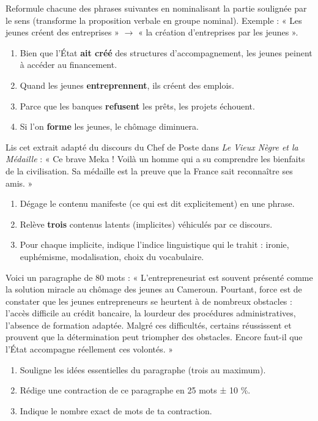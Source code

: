\documentclass[11pt]{article}
\begin{document}
\begin{exercice}[Nominalisation]
Reformule chacune des phrases suivantes en nominalisant la partie soulignée par le sens (transforme la proposition verbale en groupe nominal). Exemple : « Les jeunes créent des entreprises » $\rightarrow$ « la création d'entreprises par les jeunes ».
\begin{enumerate}
\item Bien que l'État \textbf{ait créé} des structures d'accompagnement, les jeunes peinent à accéder au financement.
\item Quand les jeunes \textbf{entreprennent}, ils créent des emplois.
\item Parce que les banques \textbf{refusent} les prêts, les projets échouent.
\item Si l'on \textbf{forme} les jeunes, le chômage diminuera.
\end{enumerate}
\end{exercice}

\begin{exercice}
Lis cet extrait adapté du discours du Chef de Poste dans \emph{Le Vieux Nègre et la Médaille} : « Ce brave Meka ! Voilà un homme qui a su comprendre les bienfaits de la civilisation. Sa médaille est la preuve que la France sait reconnaître ses amis. »
\begin{enumerate}
\item Dégage le contenu manifeste (ce qui est dit explicitement) en une phrase.
\item Relève \textbf{trois} contenus latents (implicites) véhiculés par ce discours.
\item Pour chaque implicite, indique l'indice linguistique qui le trahit : ironie, euphémisme, modalisation, choix du vocabulaire.
\end{enumerate}
\end{exercice}

\begin{exercice}
Voici un paragraphe de 80 mots : « L'entrepreneuriat est souvent présenté comme la solution miracle au chômage des jeunes au Cameroun. Pourtant, force est de constater que les jeunes entrepreneurs se heurtent à de nombreux obstacles : l'accès difficile au crédit bancaire, la lourdeur des procédures administratives, l'absence de formation adaptée. Malgré ces difficultés, certains réussissent et prouvent que la détermination peut triompher des obstacles. Encore faut-il que l'État accompagne réellement ces volontés. »
\begin{enumerate}
\item Souligne les idées essentielles du paragraphe (trois au maximum).
\item Rédige une contraction de ce paragraphe en 25 mots ± 10 \%.
\item Indique le nombre exact de mots de ta contraction.
\end{enumerate}
\end{exercice}
\end{document}
